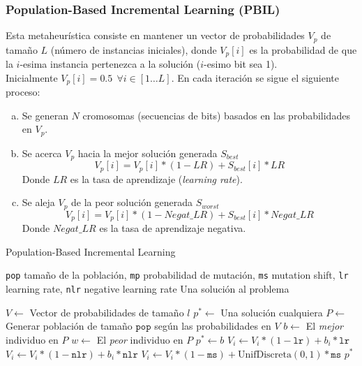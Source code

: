 \subsubsection{Population-Based Incremental Learning (PBIL)}

Esta metaheurística consiste en mantener un vector de probabilidades $V_p$ de tamaño $L$ (número de instancias iniciales), donde $V_p\left[i\right]$ es la probabilidad de que la $i$-esima instancia pertenezca a la solución ($i$-esimo bit sea 1).\\
Inicialmente $V_p\left[i\right] = 0.5\ \ \forall{i \in [1\dots L]}$. En cada iteración se sigue el siguiente proceso:

\begin{enumerate}[a)]
\item Se generan $N$ cromosomas (secuencias de bits) basados en las probabilidades en $V_p$.
\item Se acerca $V_p$ hacia la mejor solución generada $S_{best}$
$$V_p\left[i\right]=V_p\left[i\right]*(1-LR)+S_{best}\left[i\right]*LR$$
Donde $LR$ es la tasa de aprendizaje (\emph{learning rate}).
\item Se aleja $V_p$ de la peor solución generada $S_{worst}$\\
$$V_p\left[i\right]=V_p\left[i\right]*(1-Negat\_LR)+S_{best}\left[i\right]*Negat\_LR$$
Donde $Negat\_LR$ es la tasa de aprendizaje negativa.
\end{enumerate}

\begin{algorithm}
\caption{Population-Based Incremental Learning}
\label{pbil-alg}
\begin{algorithmic}[1]

\Require \texttt{pop} tamaño de la población,
	\texttt{mp} probabilidad de mutación,
	\texttt{ms} mutation shift,
	\texttt{lr} learning rate,
	\texttt{nlr} negative learning rate
\Ensure Una solución al problema

\State $V \gets$ Vector de probabilidades de tamaño $l$
\State $p^* \gets$ Una solución cualquiera
	\State $P \gets$ Generar población de tamaño $\texttt{pop}$ según las probabilidades en $V$
	\State $b \gets $ El \emph{mejor} individuo en $P$
	\State $w \gets $ El \emph{peor} individuo en $P$
		\State $p^{*} \gets b$
	\EndIf
	 
		\State $V_i \gets V_i * (1 - \texttt{lr}) + b_i * \texttt{lr}$
			\State $V_i \gets V_i * (1 - \texttt{nlr}) + b_i * \texttt{nlr}$
		\EndIf
		 
			\State $V_i \gets V_i * (1 - \texttt{ms}) + \mathrm{UnifDiscreta}(0,1) * \texttt{ms}$
		\EndIf
	\EndFor
\EndWhile
\State \Return $p^{*}$

\end{algorithmic}
\end{algorithm}

